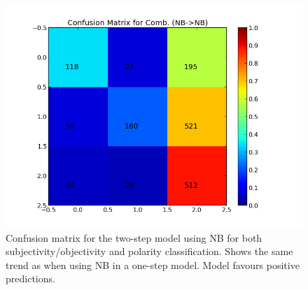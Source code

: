 \begin{minipage}[!htb]{\linewidth}
\begin{minipage}{0.45\linewidth}
\begin{figure}[H]
               \includegraphics[width=\linewidth]{../img/plots/grid/confusion_matrix_Comb-NB-NB.png}
           \caption[Plot showing the confusion matrix for two-step NB -> NB]{Confusion matrix for the two-step model using NB for both subjectivity/objectivity and polarity classification. Shows the same trend as when using NB in a one-step model. Model favours positive predictions.}
           \label{fig:confmat_nb_nb}
          \end{figure}
     \end{minipage}
\end{minipage}

